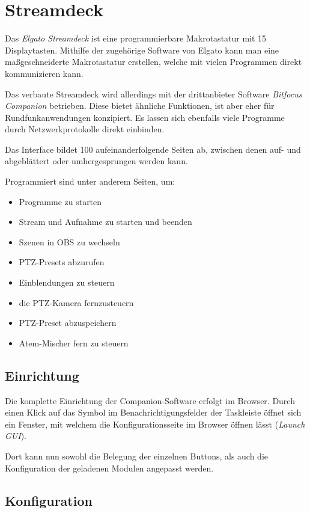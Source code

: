 \chapter{Streamdeck}
	Das \textit{Elgato Streamdeck} ist eine programmierbare Makrotastatur mit 15 Displaytasten.
	Mithilfe der zugehörige Software von Elgato kann man eine maßgeschneiderte Makrotastatur erstellen, welche mit vielen Programmen direkt kommunizieren kann.

	Das verbaute Streamdeck wird allerdings mit der drittanbieter Software \textit{Bitfocus Companion} betrieben.
	Diese bietet ähnliche Funktionen, ist aber eher für Rundfunkanwendungen konzipiert.
	Es lassen sich ebenfalls viele Programme durch Netzwerkprotokolle direkt einbinden.

	Das Interface bildet 100 aufeinanderfolgende Seiten ab, zwischen denen auf- und abgeblättert oder umhergesprungen werden kann.

	Programmiert sind unter anderem Seiten, um:
	\begin{itemize}
		\item Programme zu starten
		\item Stream und Aufnahme zu starten und beenden
		\item Szenen in \Gls{OBS} zu wechseln
		\item PTZ-Presets abzurufen
		\item Einblendungen zu steuern
		\item die \Gls{PTZ-Kamera} fernzusteuern
		\item PTZ-Preset abzuspeichern
		\item Atem-Mischer fern zu steuern
	\end{itemize}

	\section{Einrichtung}
		Die komplette Einrichtung der Companion-Software erfolgt im Browser.
		Durch einen Klick auf das Symbol im Benachrichtigungsfelder der Taskleiste öffnet sich ein Fenster, mit welchem die Konfigurationsseite im Browser öffnen lässt (\textit{Launch GUI}).

		Dort kann nun sowohl die Belegung der einzelnen Buttons, als auch die Konfiguration der geladenen Modulen angepasst werden.

	\section{Konfiguration}
